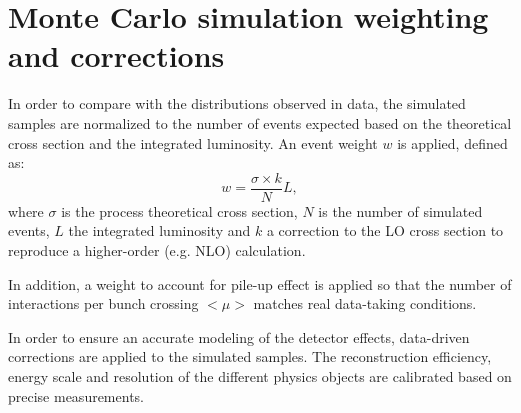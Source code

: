 \section{Monte Carlo simulation weighting and corrections}
\label{sec:mcweights}

In order to compare with the distributions observed in data, the
simulated samples are normalized to the number of events expected
based on the theoretical cross section and the integrated luminosity.
An event weight $w$ is applied, defined as:
\begin{equation}\label{eq:mcweight}
w = \dfrac{\sigma\times k}{N} L,
\end{equation}
where $\sigma$ is the process theoretical cross section, $N$ is the
number of simulated events, $L$ the integrated luminosity and $k$ a
correction to the LO cross section to reproduce a higher-order
(e.g. NLO) calculation.

In addition, a weight to account for pile-up effect is applied so that
the number of interactions per bunch crossing $<\mu>$ matches real
data-taking conditions.

In order to ensure an accurate modeling of the detector effects,
data-driven corrections are applied to the simulated samples.
The reconstruction efficiency, energy scale and resolution of the
different physics objects are calibrated based on precise
measurements. 